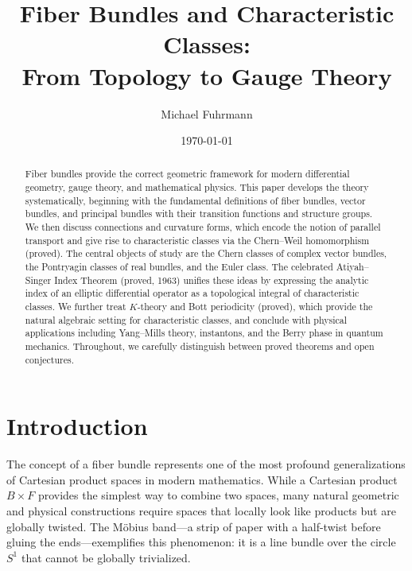 \documentclass[12pt,a4paper]{amsart}
\author{Michael Fuhrmann}
\date{\today}
\theoremstyle{definition}
\begin{document}
\title{Fiber Bundles and Characteristic Classes:\\
From Topology to Gauge Theory}

\begin{abstract}
Fiber bundles provide the correct geometric framework for modern differential
geometry, gauge theory, and mathematical physics. This paper develops the
theory systematically, beginning with the fundamental definitions of fiber
bundles, vector bundles, and principal bundles with their transition functions
and structure groups. We then discuss connections and curvature forms, which
encode the notion of parallel transport and give rise to characteristic classes
via the Chern--Weil homomorphism (proved). The central objects of study are
the Chern classes of complex vector bundles, the Pontryagin classes of real
bundles, and the Euler class. The celebrated Atiyah--Singer Index Theorem
(proved, 1963) unifies these ideas by expressing the analytic index of an
elliptic differential operator as a topological integral of characteristic
classes. We further treat $K$-theory and Bott periodicity (proved), which
provide the natural algebraic setting for characteristic classes, and conclude
with physical applications including Yang--Mills theory, instantons, and the
Berry phase in quantum mechanics. Throughout, we carefully distinguish between
proved theorems and open conjectures.
\end{abstract}

\maketitle

\tableofcontents

\section{Introduction}

The concept of a fiber bundle represents one of the most profound
generalizations of Cartesian product spaces in modern mathematics. While a
Cartesian product $B \times F$ provides the simplest way to combine two spaces,
many natural geometric and physical constructions require spaces that locally
look like products but are globally twisted. The M\"{o}bius band---a strip of
paper with a half-twist before gluing the ends---exemplifies this phenomenon: it
is a line bundle over the circle $S^1$ that cannot be globally trivialized.
\end{document}
